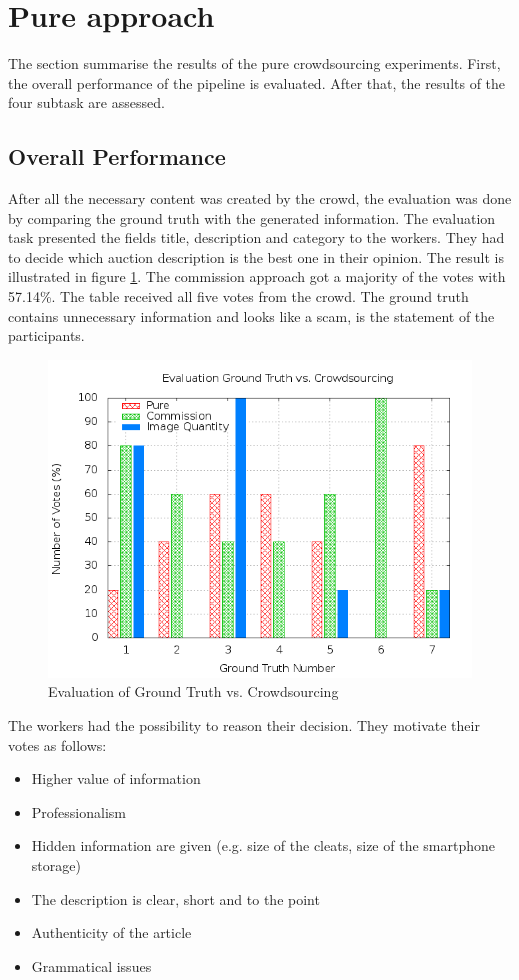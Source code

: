 \section{Pure approach}
The section summarise the results of the pure crowdsourcing experiments. First, the overall performance of the pipeline is evaluated. After that, the results of the four subtask are assessed.
\subsection{Overall Performance}
After all the necessary content was created by the crowd, the evaluation was done by comparing the ground truth with the generated information. The evaluation task presented the fields title, description and category to the workers. They had to decide which auction description is the best one in their opinion. The result is illustrated in figure \ref{crowdsourcing_eval}. The commission approach got a majority of the votes with 57.14\%. The table received all five votes from the crowd. The ground truth contains unnecessary information and looks like a scam, is the statement of the participants.\\
\begin{figure}
\centering
\includegraphics[scale=0.55]{images/plots/crowdsourcing/plot_evaluation_all.png}
\caption{Evaluation of Ground Truth vs. Crowdsourcing}
\label{crowdsourcing_eval}
\end{figure}
The workers had the possibility to reason their decision. They motivate their votes as follows: 
\begin{itemize}
	\item Higher value of information 
	\item Professionalism 
	\item Hidden information are given (e.g. size of the cleats, size of the smartphone storage) 
	\item The description is clear, short and to the point 
	\item Authenticity of the article 
	\item Grammatical issues 
\end{itemize}

